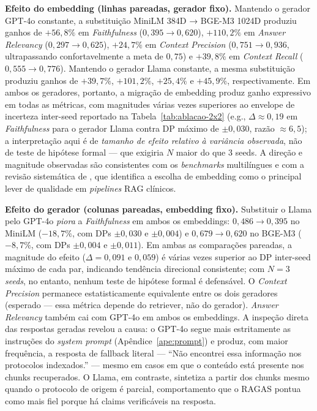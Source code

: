\documentclass[
  12pt,
  oneside,
  a4paper,
  english,
  brazil
]{abntex2}
\begin{document}
\textbf{Efeito do embedding (linhas pareadas, gerador fixo).}
Mantendo o gerador GPT-4o constante, a substituição MiniLM 384D → BGE-M3 1024D
produziu ganhos de $+56{,}8\%$ em \textit{Faithfulness}
($0{,}395 \to 0{,}620$), $+110{,}2\%$ em \textit{Answer Relevancy}
($0{,}297 \to 0{,}625$), $+24{,}7\%$ em \textit{Context Precision}
($0{,}751 \to 0{,}936$, ultrapassando confortavelmente a meta de $0{,}75$)
e $+39{,}8\%$ em \textit{Context Recall} ($0{,}555 \to 0{,}776$). Mantendo
o gerador Llama constante, a mesma substituição produziu ganhos de
$+39{,}7\%$, $+101{,}2\%$, $+25{,}4\%$ e $+45{,}9\%$, respectivamente. Em
ambos os geradores, portanto, a migração de embedding produz ganho
expressivo em todas as métricas, com magnitudes várias vezes superiores
ao envelope de incerteza inter-seed reportado na
Tabela~\ref{tab:ablacao-2x2} (e.g., $\Delta \approx 0{,}19$ em
\textit{Faithfulness} para o gerador Llama contra DP máximo de $\pm 0{,}030$,
razão $\approx 6{,}5$); a interpretação aqui é de \emph{tamanho de efeito
relativo à variância observada}, não de teste de hipótese formal --- que
exigiria $N$ maior do que 3 seeds. A direção e magnitude observadas são
consistentes com os \textit{benchmarks} multilíngues
\cite{SHTI2023, mmteb2025} e com a revisão sistemática de
\citeauthor{ocaf2024} \cite{ocaf2024}, que identifica a escolha de embedding
como o principal lever de qualidade em \textit{pipelines} RAG clínicos.

\textbf{Efeito do gerador (colunas pareadas, embedding fixo).}
Substituir o Llama pelo GPT-4o \emph{piora} a \textit{Faithfulness} em
ambos os embeddings: $0{,}486 \to 0{,}395$ no MiniLM ($-18{,}7\%$, com
DPs $\pm 0{,}030$ e $\pm 0{,}004$) e $0{,}679 \to 0{,}620$ no BGE-M3
($-8{,}7\%$, com DPs $\pm 0{,}004$ e $\pm 0{,}011$). Em ambas as
comparações pareadas, a magnitude do efeito ($\Delta = 0{,}091$ e
$0{,}059$) é várias vezes superior ao DP inter-seed máximo de cada par,
indicando tendência direcional consistente; com $N=3$ \emph{seeds}, no
entanto, nenhum teste de hipótese formal é defensável. O
\textit{Context Precision} permanece
estatisticamente equivalente entre os dois geradores (esperado --- essa
métrica depende do retriever, não do gerador). \textit{Answer Relevancy}
também cai com GPT-4o em ambos os embeddings. A inspeção direta das respostas geradas revelou a causa:
o GPT-4o segue mais estritamente as instruções do \textit{system prompt}
(Apêndice~\ref{ape:prompt}) e produz, com maior frequência, a resposta de
fallback literal --- ``Não encontrei essa informação nos protocolos
indexados.'' --- mesmo em casos em que o conteúdo está presente nos
chunks recuperados. O Llama, em contraste, sintetiza a partir dos
chunks mesmo quando o protocolo de origem é parcial, comportamento que
o RAGAS pontua como mais fiel porque há claims verificáveis na resposta.
\end{document}
